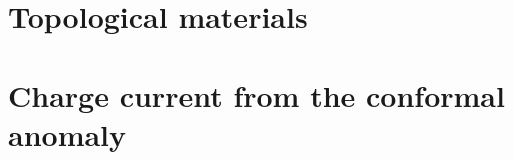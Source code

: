 \documentclass[
draft,
oneside,
]{scrbook}
\begin{document}
% 
\frontmatter

\mainmatter
\chapter{Topological materials}



\chapter{Charge current from the conformal anomaly}




\backmatter
\appendix



\printglossaries

\printbibliography

% 
\end{document}
